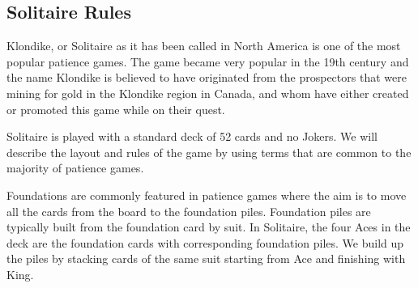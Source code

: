 \documentclass[runningheads,a4paper]{llncs}
\begin{document}
\subsection{Solitaire Rules}
\label{sec1:solitaire_rules}
Klondike, or Solitaire as it has been called in North America is one of the most popular patience games.
\newline
 The game became very popular in the 19th century and the name Klondike is believed to have originated from the prospectors that were mining for gold in the Klondike region in Canada, and whom have either created or promoted this game while on their quest. 
 \newline
 
Solitaire is played with a standard deck of 52 cards and no Jokers.
We will describe the layout and rules of the game by using terms that are common to the majority of patience games.
\newline

Foundations are commonly featured in patience games where the aim is to move all the cards from the board to the foundation piles. Foundation piles are typically built from the foundation card by suit.
In Solitaire, the four Aces in the deck are the foundation cards with corresponding foundation piles. We build up the piles by stacking cards of the same suit starting from Ace and finishing with King. 
\newline
\end{document}

